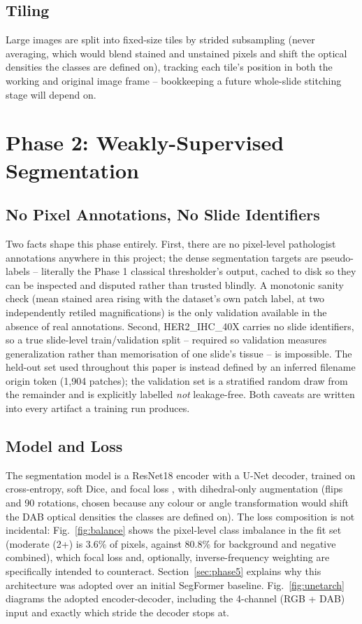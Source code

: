 \documentclass[conference]{IEEEtran}
\begin{document}
\subsection{Tiling}

Large images are split into fixed-size tiles by strided subsampling
(never averaging, which would blend stained and unstained pixels and shift
the optical densities the classes are defined on), tracking each tile's
position in both the working and original image frame -- bookkeeping a
future whole-slide stitching stage will depend on.

\section{Phase 2: Weakly-Supervised Segmentation}
\label{sec:phase2}

\subsection{No Pixel Annotations, No Slide Identifiers}

Two facts shape this phase entirely. First, there are no pixel-level
pathologist annotations anywhere in this project; the dense segmentation
targets are pseudo-labels -- literally the Phase 1 classical thresholder's
output, cached to disk so they can be inspected and disputed rather than
trusted blindly. A monotonic sanity check (mean stained area rising with
the dataset's own patch label, at two independently retiled
magnifications) is the only validation available in the absence of real
annotations. Second, HER2\_IHC\_40X carries no slide identifiers, so a true
slide-level train/validation split -- required so validation measures
generalization rather than memorisation of one slide's tissue -- is
impossible. The held-out set used throughout this paper is instead defined
by an inferred filename origin token (1{,}904 patches); the validation set
is a stratified random draw from the remainder and is explicitly labelled
\emph{not} leakage-free. Both caveats are written into every artifact a
training run produces.

\subsection{Model and Loss}

The segmentation model is a ResNet18 \cite{he2016} encoder with a U-Net
\cite{ronneberger2015} decoder, trained on cross-entropy, soft Dice, and
focal loss \cite{lin2017}, with dihedral-only augmentation (flips and
90\textdegree{} rotations, chosen because any colour or angle
transformation would shift the DAB optical densities the classes are
defined on). The loss composition is not incidental: Fig.~\ref{fig:balance}
shows the pixel-level class imbalance in the fit set (moderate (2+) is
3.6\% of pixels, against 80.8\% for background and negative combined),
which focal loss and, optionally, inverse-frequency weighting are
specifically intended to counteract. Section~\ref{sec:phase5} explains why
this architecture was adopted over an initial SegFormer baseline.
Fig.~\ref{fig:unetarch} diagrams the adopted encoder-decoder, including the
4-channel (RGB + DAB) input and exactly which stride the decoder stops at.
\end{document}
